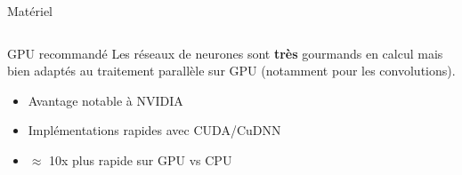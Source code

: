 \documentclass{beamer}
\begin{document}
\begin{frame}{Matériel}

\begin{columns}

\begin{column}{0.80\textwidth}
\begin{block}{GPU recommandé}
Les réseaux de neurones sont \textbf{très} gourmands en calcul mais bien adaptés au traitement parallèle sur GPU (notamment pour les convolutions).
\begin{itemize}
	\item Avantage notable à NVIDIA
    \item Implémentations rapides avec CUDA/CuDNN
    \item $\approx$ 10x plus rapide sur GPU vs CPU
\end{itemize}
\end{block}
\end{column}


\end{columns}
\end{frame}
\end{document}

